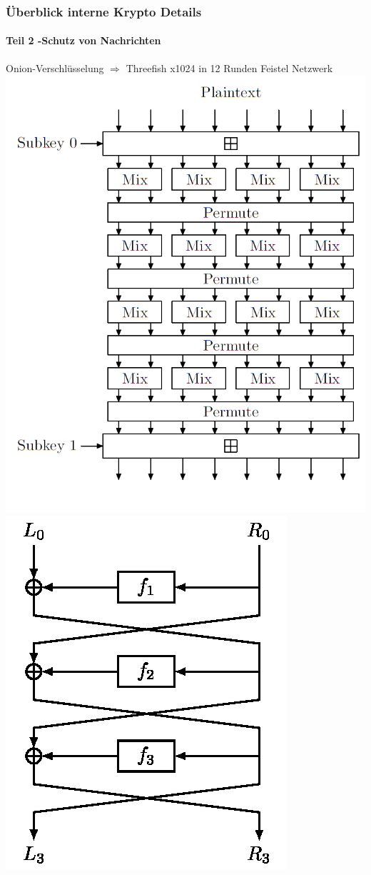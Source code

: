 \documentclass[t]{beamer}
\begin{document}
	\begin{frame}
		\frametitle{Überblick interne Krypto Details}
	
		\framesubtitle{Teil 2 -Schutz von Nachrichten}
		Onion-Verschlüsselung
	\pause $\Rightarrow$ Threefish x1024 in 12 Runden Feistel Netzwerk
	\centering\includegraphics[scale=0.25]{Threefish.png}
	\centering\includegraphics[scale=0.3]{Feistel_Network.png}
	
	\end{frame}
	
\end{document}
